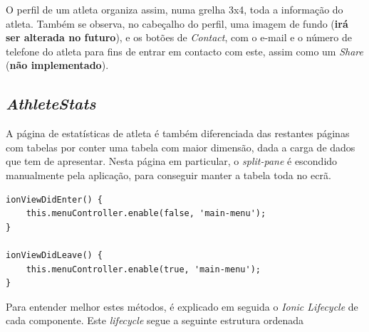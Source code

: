 O perfil de um atleta organiza assim, numa grelha 3x4, toda a informação do atleta. Também se observa, no cabeçalho do perfil, uma imagem de fundo (\textbf{irá ser alterada no futuro}), e os botões de \textit{Contact}, com o e-mail e o número de telefone do atleta para fins de entrar em contacto com este, assim como um \textit{Share} (\textbf{não implementado}).



\subsection{\textit{AthleteStats}}\label{subsec425}
A página de estatísticas de atleta é também diferenciada das restantes páginas com tabelas por conter uma tabela com maior dimensão, dada a carga de dados que tem de apresentar. Nesta página em particular, o \textit{split-pane} é escondido manualmente pela aplicação, para conseguir manter a tabela toda no ecrã. 

\begin{lstlisting}
ionViewDidEnter() {
	this.menuController.enable(false, 'main-menu');
}

ionViewDidLeave() {
	this.menuController.enable(true, 'main-menu');
}
\end{lstlisting}
Para entender melhor estes métodos, é explicado em seguida o \textit{Ionic Lifecycle} de cada componente. Este \textit{lifecycle} segue a seguinte estrutura ordenada\\

